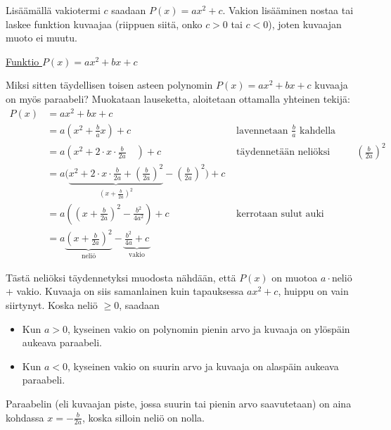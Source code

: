 Lisäämällä vakiotermi $c$ saadaan $P(x)=ax^2+c$. Vakion lisääminen nostaa tai laskee funktion kuvaajaa (riippuen siitä, onko $c > 0$ tai $c<0$), joten kuvaajan muoto ei muutu.

\underline{Funktio $P(x)=ax^2+bx+c$}

Miksi sitten täydellisen toisen asteen polynomin $P(x)=ax^2+bx+c$ kuvaaja on myös paraabeli? Muokataan lauseketta, aloitetaan ottamalla yhteinen tekijä:
\begin{align*}
P(x) &=ax^2+bx+c \\
&= a\left(x^2 +\frac{b}{a}x\right) + c  \quad &
\text{ lavennetaan } \frac{b}{a} \text{ kahdella} \\
&= a\left(x^2 +2\cdot x \cdot \frac{b}{2a} \quad\right) + c  &
\text{ täydennetään neliöksi lisäämällä} \left( \frac{b}{2a} \right)^2 \\
&= a \Bigg( \underbrace{x^2 +2\cdot x \cdot \frac{b}{2a}+\left(\frac{b}{2a} \right)^2}_{\left( x+\frac{b}{2a} \right)^2}
- \left(\frac{b}{2a}\right)^2 \Bigg)  + c \\
&= a \left( \left( x + \frac{b}{2a} \right )^2-\frac{b^2}{4a^2} \right) + c &
\text{ kerrotaan sulut auki } \\
&= a \underbrace{\left(  x + \frac{b}{2a} \right)^2}_{\text{neliö}}-
\underbrace{\frac{b^2}{4a} + c}_{\text{vakio}}
\end{align*}

Tästä neliöksi täydennetyksi muodosta nähdään, että $P(x)$ on muotoa
$a\cdot$neliö + vakio. Kuvaaja on siis samanlainen kuin tapauksessa
$ax^2+c$, huippu on vain siirtynyt.
Koska neliö $\geq 0$, saadaan

\begin{itemize}
\item Kun $a>0$, kyseinen vakio on polynomin pienin arvo ja kuvaaja on
ylöspäin aukeava paraabeli.
\item Kun $a<0$, kyseinen vakio on suurin arvo ja kuvaaja on alaspäin
aukeava paraabeli.
\end{itemize}

Paraabelin  (eli kuvaajan piste, jossa suurin tai pienin arvo
saavutetaan) on aina kohdassa
$x=-\frac{b}{2a}$, koska silloin neliö on nolla.

